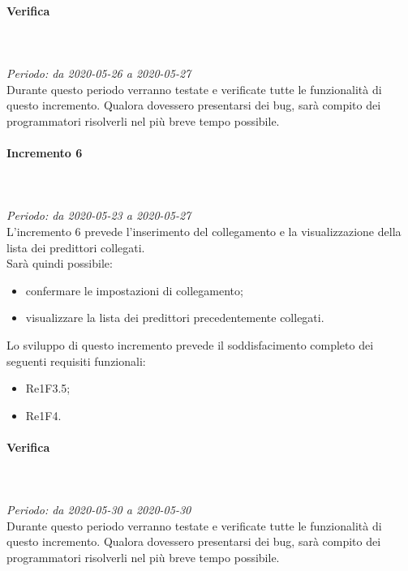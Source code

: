 \paragraph*{Verifica}\mbox{} \\ \mbox{} \\ 
\textit{Periodo: da 2020-05-26 a 2020-05-27}\\
Durante questo periodo verranno testate e verificate tutte le funzionalità di questo incremento. Qualora dovessero presentarsi dei bug, sarà compito dei programmatori risolverli nel più breve tempo possibile.

\paragraph{Incremento 6}\mbox{} \\ \mbox{} \\ 
\textit{Periodo: da 2020-05-23 a 2020-05-27}\\
L’incremento 6 prevede l'inserimento del collegamento e la visualizzazione della lista dei predittori collegati. \\
Sarà quindi possibile:
\begin{itemize}
	\item confermare le impostazioni di collegamento;
	\item visualizzare la lista dei predittori precedentemente collegati.
\end{itemize}
Lo sviluppo di questo incremento prevede il soddisfacimento completo dei seguenti requisiti funzionali:
\begin{itemize}
\item Re1F3.5;
\item Re1F4.
\end{itemize}
\paragraph*{Verifica}\mbox{} \\ \mbox{} \\ 
\textit{Periodo: da 2020-05-30 a 2020-05-30}\\
Durante questo periodo verranno testate e verificate tutte le funzionalità di questo incremento. Qualora dovessero presentarsi dei bug, sarà compito dei programmatori risolverli nel più breve tempo possibile.


